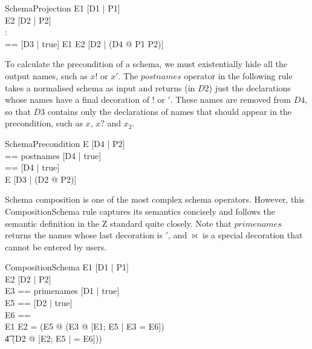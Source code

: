 \documentclass{entcs}
\newcommand{\sexprUnfoldsTo}{\mathrel{=_{se}}}
\begin{document}
\begin{zedrule}{SchemaProjection}
  E1 \sexprUnfoldsTo [D1 | P1] \\
  E2 \sexprUnfoldsTo [D2 | P2] \\
  \proviso [D1 | true] \land [D2 | true] : \power [D3] \\
  \proviso [D4 | true] == [D3 | true] \schemaminus [D2 | true]
\derives
  E1 \project E2 \sexprUnfoldsTo [D2 | (\exists D4 @ P1 \land P2)]
\end{zedrule}

To calculate the precondition of a schema, we must existentially
hide all the output names, such as $x!$ or $x'$.  The $postnames$ 
operator in the following rule takes a normalised schema as input and
returns (in $D2$) just the declarations whose names have a final decoration 
of $!$ or $'$.  These names are removed from $D4$, so that $D3$ contains 
only the declarations of names that should appear in the precondition, 
such as $x$, $x?$ and $x_2$.

\begin{zedrule}{SchemaPrecondition}
  E \sexprUnfoldsTo [D4 | P2] \\
  \proviso [D2 | true] == postnames [D4 | true] \\
  \proviso [D3 | true] == [D4 | true] \schemaminus [D2 | true] \\
\derives
  \pre E \sexprUnfoldsTo [D3 | (\exists D2 @ P2)]
\end{zedrule}

Schema composition is one of the most complex schema operators.
However, this CompositionSchema rule captures its semantics concisely
and follows the semantic definition in the Z standard quite closely.
Note that $primenames$ returns the names whose last decoration is
$'$, and $\bowtie$ is a special decoration that cannot be entered by
users.

\begin{zedrule}{CompositionSchema}
  E1 \sexprUnfoldsTo [D1 | P1] \\
  E2 \sexprUnfoldsTo [D2 | P2] \\
  \proviso E3 == primenames [D1 | true] \\
  \proviso E5 == [D2 | true]~\bowtie \\
  \proviso E6 == \theta [D2 | true]~\bowtie \\
\derives
  E1 \semi E2 = (\exists E5 @ (\exists E3 @ [E1; E5 | \theta E3 = E6]) \\
  \t4                \land (\exists D2 @ [E2; E5 |
                                    \theta [D2 | true] = E6]))
\end{zedrule}
\end{document}
